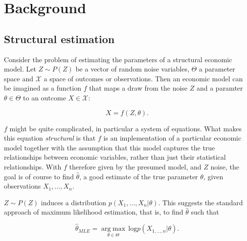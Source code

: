 
\section{Background} %
\label{sec:background}

\subsection{Structural estimation}
\label{sec:structural_estimation}

Consider the problem of estimating the parameters of a structural economic model.
Let $Z \sim P(Z)$ be a vector of random noise variables, $\Theta$ a parameter space and $\mathcal{X}$ a space of outcomes or observations.
Then an economic model can be imagined as a function $f$ that maps a draw from the noise $Z$ and a paramter $\theta \in \Theta$ to an outcome $X \in \mathcal{X}$:

\begin{equation}
    X = f(Z, \theta).
\end{equation}

$f$ might be quite complicated, in particular a system of equations.
What makes this equation \textit{structural} is that $f$ is an implementation of a particular economic model together with the assumption that this model captures the true relationships between economic variables, rather than just their statistical relationships. %
With $f$ therefore given by the presumed model, and $Z$ noise, the goal is of course to find $\hat{\theta}$, a good estimate of the true parameter $\theta$, given observations $X_1, \dots, X_n$.

$Z \sim P(Z)$ induces a distribution $p(X_1, \dots, X_n|\theta)$.
This suggests the standard approach of maximum likelihood estimation, that is, to find $\hat{\theta}$ such that

\begin{equation}
    \hat{\theta}_{MLE} = \underset{\theta\in\Theta}{\operatorname{arg\;max}}\,\text{log} p(X_{1, \dots, n}|\theta).
\end{equation}

